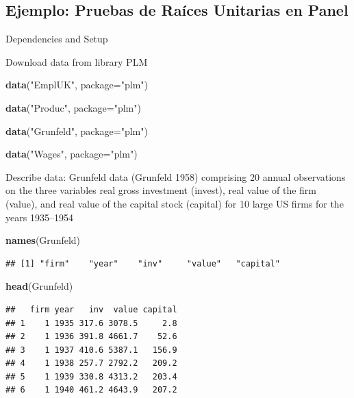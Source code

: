 \documentclass[
]{book}
\newenvironment{Shaded}{\begin{snugshade}}{\end{snugshade}}
\newcommand{\AttributeTok}[1]{\textcolor[rgb]{0.13,0.29,0.53}{#1}}
\newcommand{\FunctionTok}[1]{\textcolor[rgb]{0.13,0.29,0.53}{\textbf{#1}}}
\newcommand{\NormalTok}[1]{#1}
\newcommand{\StringTok}[1]{\textcolor[rgb]{0.31,0.60,0.02}{#1}}
\begin{document}
\hypertarget{ejemplo-pruebas-de-rauxedces-unitarias-en-panel}{%
\subsection{Ejemplo: Pruebas de Raíces Unitarias en Panel}\label{ejemplo-pruebas-de-rauxedces-unitarias-en-panel}}

Dependencies and Setup

Download data from library PLM

\begin{Shaded}
\begin{Highlighting}[]
\FunctionTok{data}\NormalTok{(}\StringTok{"EmplUK"}\NormalTok{, }\AttributeTok{package=}\StringTok{"plm"}\NormalTok{)}

\FunctionTok{data}\NormalTok{(}\StringTok{"Produc"}\NormalTok{, }\AttributeTok{package=}\StringTok{"plm"}\NormalTok{)}

\FunctionTok{data}\NormalTok{(}\StringTok{"Grunfeld"}\NormalTok{, }\AttributeTok{package=}\StringTok{"plm"}\NormalTok{)}

\FunctionTok{data}\NormalTok{(}\StringTok{"Wages"}\NormalTok{, }\AttributeTok{package=}\StringTok{"plm"}\NormalTok{)}
\end{Highlighting}
\end{Shaded}

Describe data: Grunfeld data (Grunfeld 1958) comprising 20 annual observations on the three variables real gross investment (invest), real value of the firm (value), and real value of the capital stock (capital) for 10 large US firms for the years 1935--1954

\begin{Shaded}
\begin{Highlighting}[]
\FunctionTok{names}\NormalTok{(Grunfeld)}
\end{Highlighting}
\end{Shaded}

\begin{verbatim}
## [1] "firm"    "year"    "inv"     "value"   "capital"
\end{verbatim}

\begin{Shaded}
\begin{Highlighting}[]
\FunctionTok{head}\NormalTok{(Grunfeld)}
\end{Highlighting}
\end{Shaded}

\begin{verbatim}
##   firm year   inv  value capital
## 1    1 1935 317.6 3078.5     2.8
## 2    1 1936 391.8 4661.7    52.6
## 3    1 1937 410.6 5387.1   156.9
## 4    1 1938 257.7 2792.2   209.2
## 5    1 1939 330.8 4313.2   203.4
## 6    1 1940 461.2 4643.9   207.2
\end{verbatim}
\end{document}
